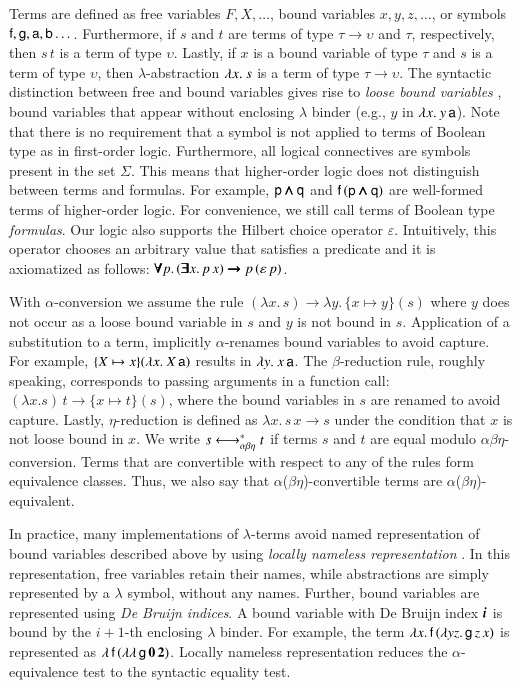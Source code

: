 Terms are defined as free variables $F, X, \ldots$, bound variables $x, y, z,
\dotsc$, or symbols $\mathsf{f}, \mathsf{g},\allowbreak \mathsf{a},\allowbreak \mathsf{b}
\dotsc$. Furthermore, if $s$ and $t$ are terms of type $\tau \rightarrow
\upsilon$ and $\tau$, respectively, then $s \, t$ is a term of type $\upsilon$.
Lastly, if $x$ is a bound variable of type $\tau$ and $s$ is a term of type
$\upsilon$, then $\lambda$-abstraction $\lambda x.\> s$ is a term of type $\tau
\rightarrow \upsilon$. The syntactic distinction between free and bound
variables gives rise to \emph{loose bound variables} \cite{tn-93-patterns},
bound variables that appear without enclosing $\lambda$ binder  (e.g., $y$ in
$\lambda x.\> y \, \mathsf{a}$). Note that there is no requirement that a
symbol is not applied to terms of Boolean type as in first-order logic.
Furthermore, all logical connectives are symbols present in the set $\Sigma$.
This means that higher-order logic does not distinguish between terms and
formulas. For example, $\mathsf{p} \pmb{\land} \mathsf{q}$ and $\mathsf{f} \, (\mathsf{p} \pmb{\land}
\mathsf{q})$ are well-formed terms of higher-order logic. For convenience, we still
call terms of Boolean type \emph{formulas}. Our logic also supports the Hilbert
choice operator $\varepsilon$. Intuitively, this operator chooses an arbitrary value that
satisfies a predicate and it is axiomatized as follows: $\pmb{\forall} p. \, (\pmb{\exists}
x. \, p \, x) \pmb{\rightarrow} p \, (\varepsilon \, p)$.


With $\alpha$-conversion we assume the rule $(\lambda x. \, s) \longrightarrow
\lambda y. \, \{x \mapsto y\}(s)$ where $y$ does not occur as a loose bound variable in $s$
and $y$ is not bound in $s$. Application of a substitution to a term,
implicitly $\alpha$-renames bound variables to avoid capture.  For example, $\{X
\mapsto x\}(\lambda x.\> X \, \mathsf{a})$ results in $\lambda y.\> x \, \mathsf{a}$. The
$\beta$-reduction rule, roughly speaking, corresponds to passing arguments in a
function call: $(\lambda x. s) \, t \longrightarrow \{x \mapsto t\} (s)$, where
the bound variables in $s$ are renamed to avoid capture. Lastly,
$\eta$-reduction is defined as $\lambda x.\, s \, x \longrightarrow s$ under the
condition that $x$ is not loose bound in $x$. We write $s \longleftrightarrow^*_{\alpha\beta\eta} t$ if terms
$s$ and $t$ are equal modulo $\alpha\beta\eta$-conversion. Terms that are
convertible with respect to any of the rules form equivalence classes. Thus, we
also say that $\alpha$($\beta\eta$)-convertible terms are
$\alpha$($\beta\eta$)-equivalent. 

In practice, many implementations of $\lambda$-terms avoid named representation
of bound variables described above by using \emph{locally nameless
representation} \cite{ac-12-locally-nameless}. In this representation, free
variables retain their names, while abstractions are simply represented by a
$\lambda$ symbol, without any names. Further, bound variables are represented
using \emph{De Bruijn indices}. A bound variable with De Bruijn index
$\textbf{\textit{i}}$ is bound by the $i+1$-th enclosing $\lambda$ binder. For example,
the term $\lambda x. \, \mathsf{f} \, (\lambda y z. \, \mathsf{g} \, z \, x)$ is represented
as $\lambda\, \mathsf{f} \, (\lambda \lambda\, \mathsf{g} \, \mathbf{0} \, \mathbf{2})$.
Locally nameless representation reduces the $\alpha$-equivalence test to 
the syntactic equality test. 

